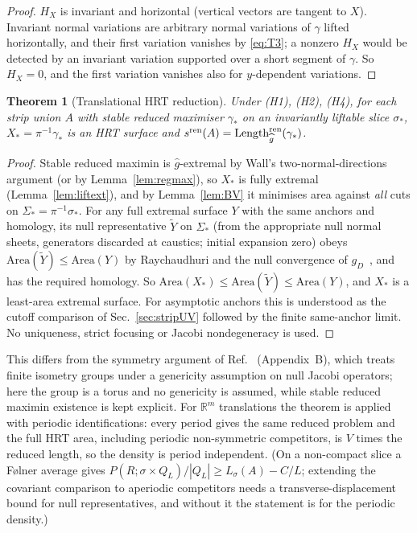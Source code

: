 \documentclass[aps,prd,onecolumn,superscriptaddress,nofootinbib,amsmath,amssymb,11pt]{revtex4-2}
\newtheorem{theorem}{Theorem}[section]
\theoremstyle{definition}
\newcommand{\R}{\mathbb{R}}
\begin{document}
\begin{proof}
$H_X$ is invariant and horizontal (vertical vectors are tangent to $X$). Invariant normal variations are arbitrary normal
variations of $\gamma$ lifted horizontally, and their first variation vanishes by \eqref{eq:T3}; a nonzero $H_X$ would be detected by
an invariant variation supported over a short segment of $\gamma$. So $H_X=0$, and the first variation vanishes also for
$y$-dependent variations.
\end{proof}

\begin{theorem}[Translational HRT reduction]\label{thm:stripsym}
Under (H1), (H2), (H4), for each strip union $A$ with stable reduced maximiser $\gamma_*$ on an invariantly liftable slice $\sigma_*$,
$X_*=\pi^{-1}\gamma_*$ is an HRT surface and $s^{\rm ren}(A)=\mathrm{Length}^{\rm ren}_{\widehat g}(\gamma_*)$.
\end{theorem}

\begin{proof}
Stable reduced maximin is $\widehat g$-extremal by Wall's two-normal-directions argument (or by Lemma~\ref{lem:regmax}), so $X_*$ is fully
extremal (Lemma~\ref{lem:liftext}), and by Lemma~\ref{lem:BV} it minimises area against \emph{all} cuts on $\Sigma_*=\pi^{-1}\sigma_*$. For any
full extremal surface $Y$ with the same anchors and homology, its null representative $\tilde Y$ on $\Sigma_*$ (from the appropriate null
normal sheets, generators discarded at caustics; initial expansion zero) obeys $\mathrm{Area}(\tilde Y)\le\mathrm{Area}(Y)$ by Raychaudhuri and
the null convergence of $g_D$~\cite{Wall2014}, and has the required homology. So
$\mathrm{Area}(X_*)\le\mathrm{Area}(\tilde Y)\le\mathrm{Area}(Y)$, and $X_*$ is a least-area extremal surface. For asymptotic anchors this is
understood as the cutoff comparison of Sec.~\ref{sec:stripUV} followed by the finite same-anchor limit. No uniqueness, strict focusing or
Jacobi nondegeneracy is used.
\end{proof}

This differs from the symmetry argument of Ref.~\cite{GGHH2025} (Appendix~B), which treats finite isometry groups under a
genericity assumption on null Jacobi operators; here the group is a torus and no genericity is assumed, while stable reduced
maximin existence is kept explicit. For $\R^m$ translations the theorem is applied with periodic identifications: every period gives
the same reduced problem and the full HRT area, including periodic non-symmetric competitors, is $V$ times the reduced length, so the
density is period independent. (On a non-compact slice a F\o lner average gives $P(R;\sigma\times Q_L)/|Q_L|\ge L_\sigma(A)-C/L$; extending the
covariant comparison to aperiodic competitors needs a transverse-displacement bound for null representatives, and without it the
statement is for the periodic density.)
\end{document}
